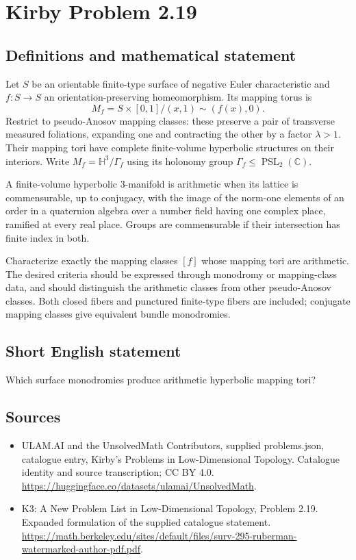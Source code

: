 \documentclass[11pt,a4paper]{article}
\begin{document}
\section*{Kirby Problem 2.19}\label{statement}

\subsection{Definitions and mathematical statement}
Let $S$ be an orientable finite-type surface of negative Euler characteristic
and $f:S\to S$ an orientation-preserving homeomorphism. Its mapping torus is
\[
M_f=S\times[0,1]/(x,1)\sim(f(x),0).
\]
Restrict to pseudo-Anosov mapping classes: these preserve a pair of transverse
measured foliations, expanding one and contracting the other by a factor
$\lambda>1$. Their mapping tori have complete finite-volume hyperbolic
structures on their interiors. Write $M_f=\mathbb H^3/\Gamma_f$ using its
holonomy group $\Gamma_f\leq\operatorname{PSL}_2(\mathbb C)$.

A finite-volume hyperbolic $3$-manifold is arithmetic when its lattice is
commensurable, up to conjugacy, with the image of the norm-one elements of an
order in a quaternion algebra over a number field having one complex place,
ramified at every real place. Groups are commensurable if their intersection
has finite index in both.

Characterize exactly the mapping classes $[f]$ whose mapping tori are
arithmetic. The desired criteria should be expressed through monodromy or
mapping-class data, and should distinguish the arithmetic classes from other
pseudo-Anosov classes. Both closed fibers and punctured finite-type fibers
are included; conjugate mapping classes give equivalent bundle monodromies.
\subsection{Short English statement}
Which surface monodromies produce arithmetic hyperbolic mapping tori?
\subsection{Sources}
\begin{itemize}
\item[S1] ULAM.AI and the UnsolvedMath Contributors, supplied problems.json, catalogue entry, Kirby's Problems in Low-Dimensional Topology. Catalogue identity and source transcription; CC BY 4.0.
\url{https://huggingface.co/datasets/ulamai/UnsolvedMath}.
\item[S2] K3: A New Problem List in Low-Dimensional Topology, Problem 2.19. Expanded formulation of the supplied catalogue statement.
\url{https://math.berkeley.edu/sites/default/files/surv-295-ruberman-watermarked-author-pdf.pdf}.
\end{itemize}
\end{document}
